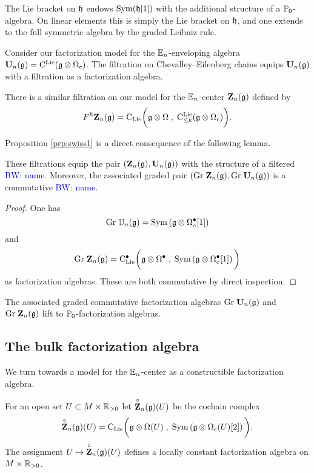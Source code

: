 \documentclass[11pt]{amsart}
\numberwithin{equation}{section}
\def\brian{\textcolor{blue}{BW: }\textcolor{blue}}
\begin{document}
The Lie bracket on $\mathfrak h$ endows ${\rm Sym} (\mathfrak h [1])$ with the additional structure of a $\mathbb P_0$-algebra. 
On linear elements this is simply the Lie bracket on $\mathfrak h$, and one extends to the full symmetric algebra by the graded Leibniz rule.

Consider our factorization model for the $\mathbb E_n$-enveloping algebra $\mathbf U_n(\mathfrak g) = {\rm C}^{\rm Lie} (\mathfrak g \otimes \Omega_c)$. 
The filtration on Chevalley--Eilenberg chains equips $\mathbf U_n(\mathfrak g)$ with a filtration as a factorization algebra. 

There is a similar filtration on our model for the $\mathbb E_n$-center $\mathbf Z_n(\mathfrak g)$ defined by
\[
F^k \mathbf Z_n(\mathfrak g) = {\rm C}_{{\rm Lie}} \bigg(\mathfrak g \otimes \Omega \; , \; {\rm C}^{\rm Lie}_{\leq k} (\mathfrak g \otimes \Omega_c) \bigg) .
\]

Proposition \ref{prp:swiss1} is a direct consequence of the following lemma.

\begin{lmm}
These filtrations equip the pair $(\mathbf Z_n (\mathfrak g), \mathbf U_n(\mathfrak g))$ with the structure of a filtered \brian{name}.
Moreover, the associated graded pair $({\rm Gr} \; \mathbf Z_n (\mathfrak g), {\rm Gr} \; \mathbf U_n(\mathfrak g))$ is a commutative \brian{name}. 
\end{lmm}
\begin{proof}
One has
\[
{\rm Gr} \; \mathbb U_n (\mathfrak g) = {\rm Sym} \left(\mathfrak g \otimes \Omega^\bullet_c [1] \right)
\]
and
\[
{\rm Gr} \; \mathbf Z_n (\mathfrak g) = {\rm C}_{{\rm Lie}}^\bullet\bigg(\mathfrak g \otimes \Omega^\bullet \; , \; {\rm Sym} \left(\mathfrak g \otimes \Omega^\bullet_c [1]\right) \bigg) 
\]
as factorization algebras. 
These are both commutative by direct inspection. 
\end{proof}

The associated graded commutative factorization algebras ${\rm Gr} \; \mathbf U_n (\mathfrak g)$ and ${\rm Gr} \; \mathbf Z_n(\mathfrak g)$ lift to $\mathbb P_0$-factorization algebras.

\subsection{The bulk factorization algebra}

We turn towards a model for the $\mathbb E_n$-center as a constructible factorization algebra. 

\begin{dfn}
For an open set $U \subset M \times \mathbb R_{>0}$ let $\overset{\circ}{\bf Z}_n(\mathfrak g) (U)$ be the cochain complex 
\[
\overset{\circ}{\bf Z}_n(\mathfrak g) (U) = {\rm C}_{{\rm Lie}} \bigg(\mathfrak g \otimes \Omega (U) \; , \; {\rm Sym} \left(\mathfrak g \otimes \Omega_c(U) [2] \right) \bigg) .
\]
The assignment $U \mapsto \overset{\circ}{\bf Z}_n(\mathfrak g) (U)$ defines a locally constant factorization algebra on $M \times \mathbb R_{>0}$. 
\end{dfn}
\end{document}
